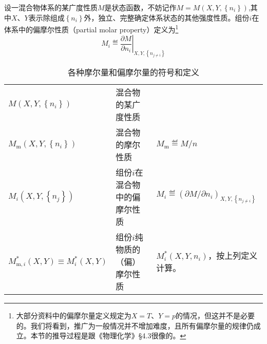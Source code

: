 \documentclass[main.tex]{subfiles}
\begin{document}
设一混合物体系的某广度性质$M$是状态函数，不妨记作$M=M\left(X,Y,\left\{n_i\right\}\right)$,其中$X$、$Y$表示除组成$\left\{n_i\right\}$外，独立、完整确定体系状态的其他强度性质。组份$i$在体系中的偏摩尔性质（partial molar property）定义为\footnote{大部分资料中的偏摩尔量定义规定为$X=T$、$Y=p$的情况，但这并不是必要的。我们将看到，推广为一般情况并不增加难度，且所有偏摩尔量的规律仍成立。本节的推导过程是跟《物理化学》\S4.3很像的。}
\[M_i\eqdef\left.\frac{\partial M}{\partial n_i}\right|_{X,Y,\left\{n_{j\neq i}\right\}}\]

\begin{longtable}{p{}p{}p{}}
    \caption{各种摩尔量和偏摩尔量的符号和定义}\label{tab:molar_partial_molar_notaion}                                                                                                    \\
    \hline
    $M\left(X,Y,\left\{n_i\right\}\right)$                         & 混合物的某广度性质        &                                                                                  \\
    $M_\text{m}\left(X,Y,\left\{n_i\right\}\right)$                & 混合物的摩尔性质         & $M_\text{m}\eqdef M/n$                                                           \\
    $M_i\left(X,Y,\left\{n_j\right\}\right)$                       & 组份$i$在混合物中的偏摩尔性质 & $M_i\eqdef\left(\partial M/\partial n_i\right)_{X,Y,\left\{n_{j\neq i}\right\}}$ \\
    $M_{\text{m},i}^*\left(X,Y\right)\equiv M_i^*\left(X,Y\right)$ & 组份$i$纯物质的（偏）摩尔性质 & $M_i^*\left(X,Y,n_i\right)$，按上列定义计算。                                             \\
    \hline
\end{longtable}
\end{document}
